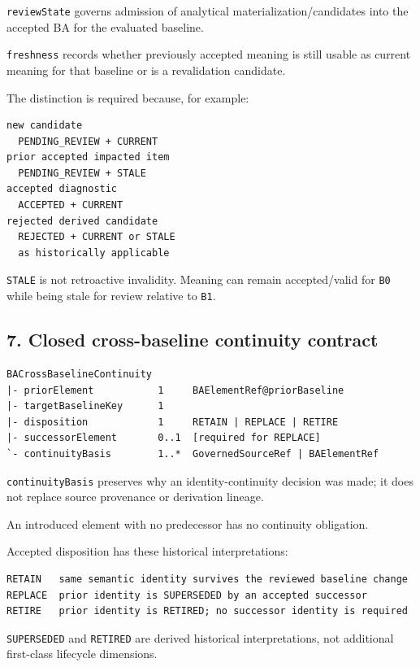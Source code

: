 \documentclass[11pt,a4paper]{article}
\begin{document}
\texttt{reviewState} governs admission of analytical materialization/candidates into the accepted BA for the evaluated baseline.

\texttt{freshness} records whether previously accepted meaning is still usable as current meaning for that baseline or is a revalidation candidate.

The distinction is required because, for example:

\begin{verbatim}
new candidate
  PENDING_REVIEW + CURRENT
prior accepted impacted item
  PENDING_REVIEW + STALE
accepted diagnostic
  ACCEPTED + CURRENT
rejected derived candidate
  REJECTED + CURRENT or STALE
  as historically applicable
\end{verbatim}

\texttt{STALE} is not retroactive invalidity. Meaning can remain accepted/valid for \texttt{B0} while being stale for review relative to \texttt{B1}.

\subsection{7. Closed cross-baseline continuity contract}\label{closed-cross-baseline-continuity-contract}

\begin{verbatim}
BACrossBaselineContinuity
|- priorElement           1     BAElementRef@priorBaseline
|- targetBaselineKey      1
|- disposition            1     RETAIN | REPLACE | RETIRE
|- successorElement       0..1  [required for REPLACE]
`- continuityBasis        1..*  GovernedSourceRef | BAElementRef
\end{verbatim}

\texttt{continuityBasis} preserves why an identity-continuity decision was made; it does not replace source provenance or derivation lineage.

An introduced element with no predecessor has no continuity obligation.

Accepted disposition has these historical interpretations:

\begin{verbatim}
RETAIN   same semantic identity survives the reviewed baseline change
REPLACE  prior identity is SUPERSEDED by an accepted successor
RETIRE   prior identity is RETIRED; no successor identity is required
\end{verbatim}

\texttt{SUPERSEDED} and \texttt{RETIRED} are derived historical interpretations, not additional first-class lifecycle dimensions.
\end{document}
